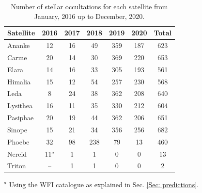 \documentclass[useAMS,usenatbib]{mn2e}
\begin{document}
\begin{table}
\caption{\label{Tab: satellite-occultation} Number of stellar occultations for each satellite from January, 2016 up to December, 2020.}
\begin{centering}
\begin{tabular}{lcccccc}
\hline  \hline
Satellite  & 2016 & 2017 & 2018 & 2019 & 2020 & Total \tabularnewline
\hline
Ananke & 12 & 16 & 49 & 359 & 187 & 623 \tabularnewline
Carme & 20 & 14 & 30 & 369 & 220 & 653 \tabularnewline
Elara & 14 & 16 & 33 & 305 & 193 & 561 \tabularnewline
Himalia & 15 & 12 & 54 & 257 & 230 & 568 \tabularnewline
Leda & 8 & 24 & 38 & 362 & 208 & 640 \tabularnewline
Lysithea & 16 & 11 & 35 & 330 & 212 & 604 \tabularnewline
Pasiphae & 20 & 19 & 44 & 362 & 206 & 651 \tabularnewline
Sinope & 15 & 21 & 34 & 356 & 256 & 682 \tabularnewline
\hdashline
Phoebe & 32 & 98 & 238 & 79 & 13 & 460 \tabularnewline
\hdashline
Nereid & 11$^{a}$ & 1 & 1 & 0 & 0 & 13 \tabularnewline
Triton & -- & 1 & 1 & 0 & 0 & 2 \tabularnewline
\hline
\end{tabular}
\par \end{centering}
$^{a}$ {Using the WFI catalogue as explained in Sec. \ref{Sec: predictions}}.
\end{table}
\end{document}
